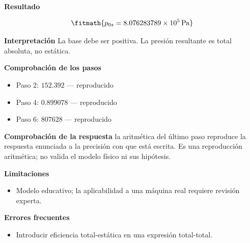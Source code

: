 \documentclass[10pt,openany]{book}
\begin{document}
\begin{tcolorbox}[title={Problema resuelto 3}, studiumworked, breakable]
\noindent\textbf{Resultado}

\[
\fitmath{p_{0s}=8.076283789\times10^{5}\,\mathrm{Pa}}
\]

\noindent\textbf{Interpretación}
La base debe ser positiva. La presión resultante es total absoluta, no estática.

\noindent\textbf{Comprobación de los pasos}
\begin{itemize}
\item Paso 2: $152.392$ — reproducido
\item Paso 4: $0.899078$ — reproducido
\item Paso 6: $807628$ — reproducido
\end{itemize}

\noindent\textbf{Comprobación de la respuesta} la aritmética del último paso reproduce la respuesta enunciada a la precisión con que está escrita. Es una reproducción aritmética; no valida el modelo físico ni sus hipótesis.

\noindent\textbf{Limitaciones}
\begin{itemize}
\item Modelo educativo; la aplicabilidad a una máquina real requiere revisión experta.
\end{itemize}

\noindent\textbf{Errores frecuentes}
\begin{itemize}
\item Introducir eficiencia total-estática en una expresión total-total.
\end{itemize}
\end{tcolorbox}
\end{document}
